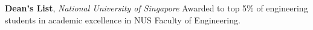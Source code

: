 \documentclass[letterpaper,10pt,oneside]{article}
\begin{document}
\begin{body}
\textbf{Dean's List}, \textit{National University of Singapore}
\hfill
{}
\BulletItem
Awarded to top 5\% of engineering students in academic excellence in NUS Faculty of Engineering.
\GapNoBreak
















\end{body}
\end{document}
